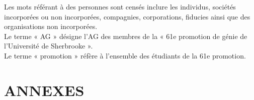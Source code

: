 \documentclass{article}
\renewcommand{\(}{\left}
\renewcommand{\)}{\right)}
\renewcommand{\[}{\left[}
\renewcommand{\]}{\right]}
\begin{document}
\noindent Les mots référant à des personnes sont censés inclure les individus, sociétés incorporées ou non incorporées, compagnies, corporations, fiducies ainsi que des organisations non incorporées. \\

\noindent Le terme « AG » désigne l’AG des membres de la « 61e promotion de génie de l’Université de Sherbrooke ». \\

\noindent Le terme « promotion » réfère à l’ensemble des étudiants de la 61e promotion.\\

\newpage

\newpage

\newpage

\newpage

\newpage

\newpage

\newpage

\newpage

\newpage

\newpage

\newpage
\appendix
\setcounter{secnumdepth}{0}
{\centering
\section*{ANNEXES}


}


\end{document}
